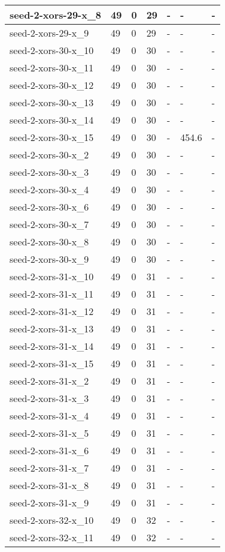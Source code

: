 \begin{scriptsize}
\begin{longtable}{|p{5cm}|l|l|l|l|l|l|}
seed-2-xors-29-x\_8&49&0&29&-&-&- \\ \hline 
seed-2-xors-29-x\_9&49&0&29&-&-&- \\ \hline 
seed-2-xors-30-x\_10&49&0&30&-&-&- \\ \hline 
seed-2-xors-30-x\_11&49&0&30&-&-&- \\ \hline 
seed-2-xors-30-x\_12&49&0&30&-&-&- \\ \hline 
seed-2-xors-30-x\_13&49&0&30&-&-&- \\ \hline 
seed-2-xors-30-x\_14&49&0&30&-&-&- \\ \hline 
seed-2-xors-30-x\_15&49&0&30&-&454.6&- \\ \hline 
seed-2-xors-30-x\_2&49&0&30&-&-&- \\ \hline 
seed-2-xors-30-x\_3&49&0&30&-&-&- \\ \hline 
seed-2-xors-30-x\_4&49&0&30&-&-&- \\ \hline 
seed-2-xors-30-x\_6&49&0&30&-&-&- \\ \hline 
seed-2-xors-30-x\_7&49&0&30&-&-&- \\ \hline 
seed-2-xors-30-x\_8&49&0&30&-&-&- \\ \hline 
seed-2-xors-30-x\_9&49&0&30&-&-&- \\ \hline 
seed-2-xors-31-x\_10&49&0&31&-&-&- \\ \hline 
seed-2-xors-31-x\_11&49&0&31&-&-&- \\ \hline 
seed-2-xors-31-x\_12&49&0&31&-&-&- \\ \hline 
seed-2-xors-31-x\_13&49&0&31&-&-&- \\ \hline 
seed-2-xors-31-x\_14&49&0&31&-&-&- \\ \hline 
seed-2-xors-31-x\_15&49&0&31&-&-&- \\ \hline 
seed-2-xors-31-x\_2&49&0&31&-&-&- \\ \hline 
seed-2-xors-31-x\_3&49&0&31&-&-&- \\ \hline 
seed-2-xors-31-x\_4&49&0&31&-&-&- \\ \hline 
seed-2-xors-31-x\_5&49&0&31&-&-&- \\ \hline 
seed-2-xors-31-x\_6&49&0&31&-&-&- \\ \hline 
seed-2-xors-31-x\_7&49&0&31&-&-&- \\ \hline 
seed-2-xors-31-x\_8&49&0&31&-&-&- \\ \hline 
seed-2-xors-31-x\_9&49&0&31&-&-&- \\ \hline 
seed-2-xors-32-x\_10&49&0&32&-&-&- \\ \hline 
seed-2-xors-32-x\_11&49&0&32&-&-&- \\ \hline 

\end{longtable}
\end{scriptsize}
